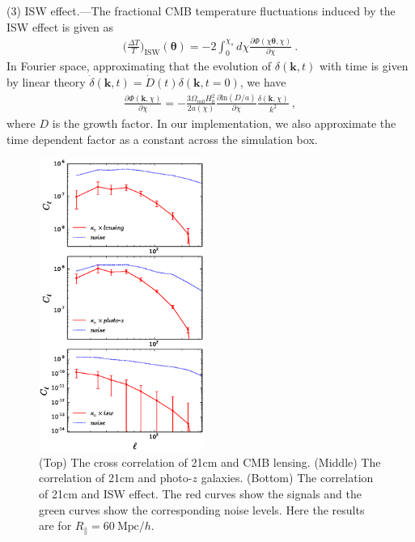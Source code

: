 \documentclass[aps,prl,twocolumn,showpacs,superscriptaddress,groupedaddress,nofootinbib]{revtex4}  %
\newcommand{\mr}{\mathrm}
\begin{document}
(3) ISW effect.---The fractional CMB temperature fluctuations induced by the 
ISW effect is given as 
\begin{eqnarray}
\bigg(\frac{\Delta T}{T}\bigg)_\mr{ISW}(\bm\theta)=-2\int_0^{\chi_s}d\chi
\frac{\partial\Phi(\chi\bm{\theta},\chi)}{\partial\chi}\ .
\end{eqnarray}
In Fourier space, approximating that the evolution of $\delta(\bm{k},t)$ with 
time is given by linear theory
$\dot\delta(\bm{k},t)=\dot D(t)\delta(\bm{k},t=0)$, we have
\begin{eqnarray}
\frac{\partial\Phi(\bm{k},\chi)}{\partial\chi}=-\frac{3\Omega_{m0}H_0^2}
{2a(\chi)}\frac{\partial\mr{ln}(D/a)}{\partial\chi}
\frac{\delta(\bm{k},\chi)}{k^2}\ ,
\end{eqnarray}
where $D$ is the growth factor.
In our implementation, we also approximate the time dependent factor as a 
constant across the simulation box.

\begin{figure}[tbp]
\begin{center}
\includegraphics[width=0.48\textwidth]{f8.eps}
\end{center}
\vspace{-1.9cm}
\caption{(Top) The cross correlation of 21cm and CMB lensing.
(Middle) The correlation of 21cm and photo-$z$ galaxies. (Bottom) The
correlation of 21cm and ISW effect. The red curves show the signals and the 
green curves show the corresponding noise levels. Here the results are 
for $R_\parallel=60\ \mr{Mpc}/h$.}
\label{fig:cs}
\end{figure}
\end{document}
